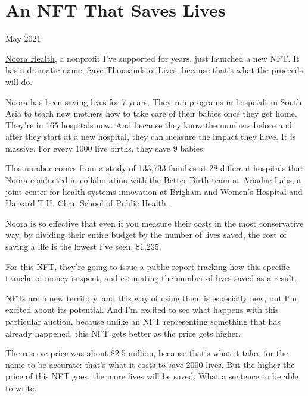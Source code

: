 \chapter{An NFT That Saves Lives}

May 2021

\href{https://www.noorahealth.org/}{Noora Health}, a nonprofit I've
supported for years, just launched a new NFT. It has a dramatic name,
\href{http://bit.ly/NooraNFT}{Save Thousands of Lives}, because that's
what the proceeds will do.

Noora has been saving lives for 7 years. They run programs in hospitals
in South Asia to teach new mothers how to take care of their babies once
they get home. They're in 165 hospitals now. And because they know the
numbers before and after they start at a new hospital, they can measure
the impact they have. It is massive. For every 1000 live births, they
save 9 babies.

This number comes from a \href{http://bit.ly/NFT-research}{study} of
133,733 families at 28 different hospitals that Noora conducted in
collaboration with the Better Birth team at Ariadne Labs, a joint center
for health systems innovation at Brigham and Women's Hospital and
Harvard T.H. Chan School of Public Health.

Noora is so effective that even if you measure their costs in the most
conservative way, by dividing their entire budget by the number of lives
saved, the cost of saving a life is the lowest I've seen. \$1,235.

For this NFT, they're going to issue a public report tracking how this
specific tranche of money is spent, and estimating the number of lives
saved as a result.

NFTs are a new territory, and this way of using them is especially new,
but I'm excited about its potential. And I'm excited to see what happens
with this particular auction, because unlike an NFT representing
something that has already happened, this NFT gets better as the price
gets higher.

The reserve price was about \$2.5 million, because that's what it takes
for the name to be accurate: that's what it costs to save 2000 lives.
But the higher the price of this NFT goes, the more lives will be saved.
What a sentence to be able to write.